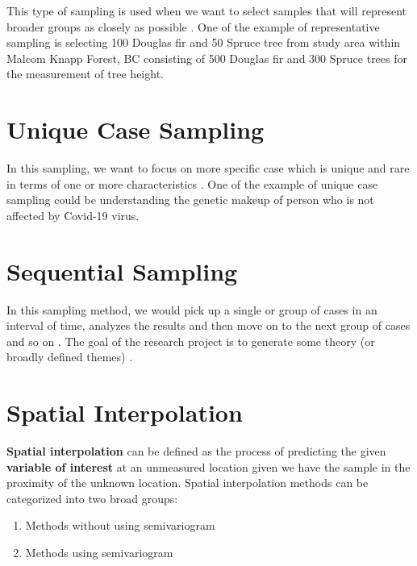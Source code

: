 \documentclass[
]{book}
\providecommand{\tightlist}{%
  \setlength{\itemsep}{0pt}\setlength{\parskip}{0pt}}
\begin{document}
This type of sampling is used when we want to select samples that will represent broader groups as closely as possible \citep{teddlie_mixed_2007}. One of the example of representative sampling is selecting 100 Douglas fir and 50 Spruce tree from study area within Malcom Knapp Forest, BC consisting of 500 Douglas fir and 300 Spruce trees for the measurement of tree height.

\hypertarget{unique-case-sampling}{%
\section{Unique Case Sampling}\label{unique-case-sampling}}

In this sampling, we want to focus on more specific case which is unique and rare in terms of one or more characteristics \citep{teddlie_mixed_2007}. One of the example of unique case sampling could be understanding the genetic makeup of person who is not affected by Covid-19 virus.

\hypertarget{sequential-sampling}{%
\section{Sequential Sampling}\label{sequential-sampling}}

In this sampling method, we would pick up a single or group of cases in an interval of time, analyzes the results and then move on to the next group of cases and so on \citep{teddlie_mixed_2007}. The goal of the research project is to generate some theory (or broadly defined themes) \citep{teddlie_mixed_2007}.

\hypertarget{spatial-interpolation}{%
\section{Spatial Interpolation}\label{spatial-interpolation}}

\textbf{Spatial interpolation} can be defined as the process of predicting the given \textbf{variable of interest} at an unmeasured location given we have the sample in the proximity of the unknown location. Spatial interpolation methods can be categorized into two broad groups:

\begin{enumerate}
\def\labelenumi{\arabic{enumi}.}
\tightlist
\item
  Methods without using semivariogram
\item
  Methods using semivariogram
\end{enumerate}
\end{document}
